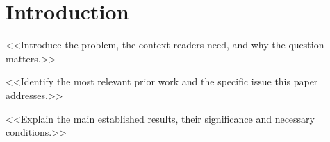 \section{Introduction}\label{sec:intro}
<<Introduce the problem, the context readers need, and why the question matters.>>

<<Identify the most relevant prior work and the specific issue this paper addresses.>>

<<Explain the main established results, their significance and necessary conditions.>>
